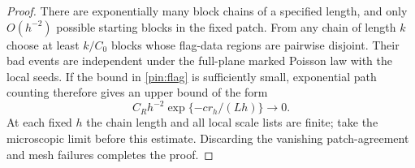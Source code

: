 \begin{proof}
There are exponentially many block chains of a specified length, and
only $O(h^{-2})$ possible starting blocks in the fixed patch.  From any
chain of length $k$ choose at least $k/C_0$ blocks whose flag-data
regions are pairwise disjoint.  Their bad events are independent under
the full-plane marked Poisson law with the local seeds.  If the bound
in \eqref{pin:flag} is sufficiently small, exponential path counting
therefore gives an upper bound of the form
\[
          C_Rh^{-2}\exp\{-c r_h/(Lh)\}\longrightarrow0.
\]
At each fixed $h$ the chain length and all local scale lists are finite;
take the microscopic limit before this estimate.  Discarding the
vanishing patch-agreement and mesh failures completes the proof.
\end{proof}
